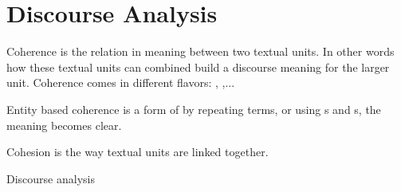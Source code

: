 \section{Discourse Analysis}
\begin{df}{Coherence}
\sb{} is the relation in meaning between two textual units. In other words how these textual units can combined build a discourse meaning for the larger unit. Coherence comes in different flavors: , ,...
\end{df}
\begin{df}{Entity based coherence}
\sb{} is a form of  by repeating terms, or using s and s, the meaning becomes clear.
\end{df}
\begin{df}{Cohesion}
\sb{} is the way textual units are linked together.
\end{df}
\begin{df}{Discourse analysis}

\end{df}